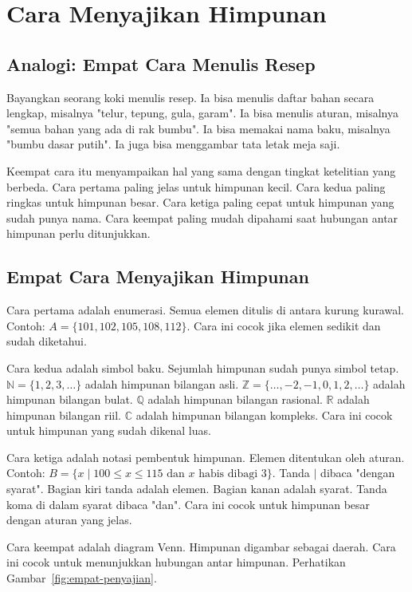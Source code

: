 \documentclass[11pt,a4paper]{article}
\begin{document}
\section{Cara Menyajikan Himpunan}

\subsection{Analogi: Empat Cara Menulis Resep}

Bayangkan seorang koki menulis resep. Ia bisa menulis daftar bahan secara lengkap, misalnya "telur, tepung, gula, garam". Ia bisa menulis aturan, misalnya "semua bahan yang ada di rak bumbu". Ia bisa memakai nama baku, misalnya "bumbu dasar putih". Ia juga bisa menggambar tata letak meja saji.

Keempat cara itu menyampaikan hal yang sama dengan tingkat ketelitian yang berbeda. Cara pertama paling jelas untuk himpunan kecil. Cara kedua paling ringkas untuk himpunan besar. Cara ketiga paling cepat untuk himpunan yang sudah punya nama. Cara keempat paling mudah dipahami saat hubungan antar himpunan perlu ditunjukkan.

\subsection{Empat Cara Menyajikan Himpunan}

Cara pertama adalah enumerasi. Semua elemen ditulis di antara kurung kurawal. Contoh: $A=\{101,102,105,108,112\}$. Cara ini cocok jika elemen sedikit dan sudah diketahui.

Cara kedua adalah simbol baku. Sejumlah himpunan sudah punya simbol tetap. $\mathbb{N}=\{1,2,3,\ldots\}$ adalah himpunan bilangan asli. $\mathbb{Z}=\{\ldots,-2,-1,0,1,2,\ldots\}$ adalah himpunan bilangan bulat. $\mathbb{Q}$ adalah himpunan bilangan rasional. $\mathbb{R}$ adalah himpunan bilangan riil. $\mathbb{C}$ adalah himpunan bilangan kompleks. Cara ini cocok untuk himpunan yang sudah dikenal luas.

Cara ketiga adalah notasi pembentuk himpunan. Elemen ditentukan oleh aturan. Contoh: $B=\{x \mid 100 \le x \le 115 \text{ dan } x \text{ habis dibagi } 3\}$. Tanda $\mid$ dibaca "dengan syarat". Bagian kiri tanda adalah elemen. Bagian kanan adalah syarat. Tanda koma di dalam syarat dibaca "dan". Cara ini cocok untuk himpunan besar dengan aturan yang jelas.

Cara keempat adalah diagram Venn. Himpunan digambar sebagai daerah. Cara ini cocok untuk menunjukkan hubungan antar himpunan. Perhatikan Gambar~\ref{fig:empat-penyajian}.
\end{document}
